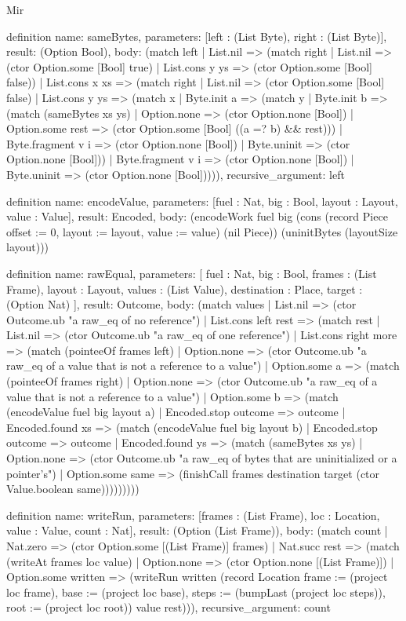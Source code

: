 \begin{lexlean}{Mir}
\begin{semanticmodule}
definition{
  name: sameBytes,
  parameters: [left : (List Byte), right : (List Byte)],
  result: (Option Bool),
  body: (match left
    | List.nil => (match right
      | List.nil => (ctor Option.some [Bool] true)
      | List.cons y ys => (ctor Option.some [Bool] false))
    | List.cons x xs => (match right
      | List.nil => (ctor Option.some [Bool] false)
      | List.cons y ys => (match x
        | Byte.init a => (match y
          | Byte.init b => (match (sameBytes xs ys)
            | Option.none => (ctor Option.none [Bool])
            | Option.some rest => (ctor Option.some [Bool] ((a =? b) && rest)))
          | Byte.fragment v i => (ctor Option.none [Bool])
          | Byte.uninit => (ctor Option.none [Bool]))
        | Byte.fragment v i => (ctor Option.none [Bool])
        | Byte.uninit => (ctor Option.none [Bool])))),
  recursive_argument: left
}

definition{
  name: encodeValue,
  parameters: [fuel : Nat, big : Bool, layout : Layout, value : Value],
  result: Encoded,
  body: (encodeWork fuel big (cons (record Piece {offset := 0, layout := layout, value := value}) (nil Piece)) (uninitBytes (layoutSize layout)))
}

definition{
  name: rawEqual,
  parameters: [
    fuel : Nat,
    big : Bool,
    frames : (List Frame),
    layout : Layout,
    values : (List Value),
    destination : Place,
    target : (Option Nat)
  ],
  result: Outcome,
  body: (match values
    | List.nil => (ctor Outcome.ub "a raw_eq of no reference")
    | List.cons left rest => (match rest
      | List.nil => (ctor Outcome.ub "a raw_eq of one reference")
      | List.cons right more => (match (pointeeOf frames left)
        | Option.none => (ctor Outcome.ub "a raw_eq of a value that is not a reference to a value")
        | Option.some a => (match (pointeeOf frames right)
          | Option.none => (ctor Outcome.ub "a raw_eq of a value that is not a reference to a value")
          | Option.some b => (match (encodeValue fuel big layout a)
            | Encoded.stop outcome => outcome
            | Encoded.found xs => (match (encodeValue fuel big layout b)
              | Encoded.stop outcome => outcome
              | Encoded.found ys => (match (sameBytes xs ys)
                | Option.none => (ctor Outcome.ub "a raw_eq of bytes that are uninitialized or a pointer's")
                | Option.some same => (finishCall frames destination target (ctor Value.boolean same)))))))))
}

definition{
  name: writeRun,
  parameters: [frames : (List Frame), loc : Location, value : Value, count : Nat],
  result: (Option (List Frame)),
  body: (match count
    | Nat.zero => (ctor Option.some [(List Frame)] frames)
    | Nat.succ rest => (match (writeAt frames loc value)
      | Option.none => (ctor Option.none [(List Frame)])
      | Option.some written => (writeRun written (record Location {frame := (project loc frame), base := (project loc base), steps := (bumpLast (project loc steps)), root := (project loc root)}) value rest))),
  recursive_argument: count
}


\end{semanticmodule}
\end{lexlean}
